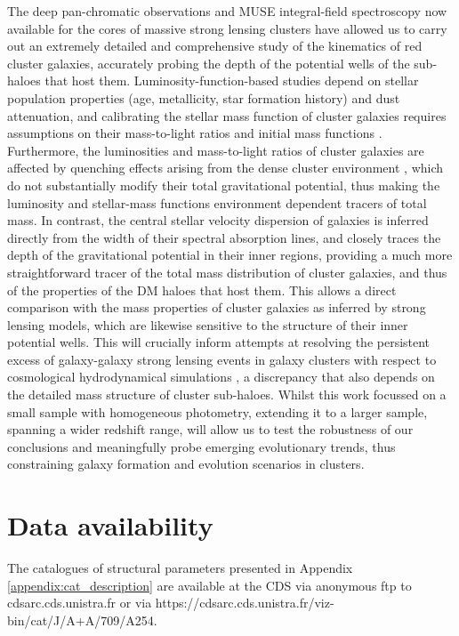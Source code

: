 \documentclass{aa}
\begin{document}
The deep pan-chromatic observations and MUSE integral-field spectroscopy now available for the cores of massive strong lensing clusters have allowed us to carry out an extremely detailed and comprehensive study of the kinematics of red cluster galaxies, accurately probing the depth of the potential wells of the sub-haloes that host them. Luminosity-function-based studies depend on stellar population properties (age, metallicity, star formation history) and dust attenuation, and calibrating the stellar mass function of cluster galaxies requires assumptions on their mass-to-light ratios and initial mass functions \citep[e.g.][]{bernardi10,monterodorta17}. Furthermore, the luminosities and mass-to-light ratios of cluster galaxies are affected by quenching effects arising from the dense cluster environment \citep[e.g. ram-pressure stripping and starvation, see][]{gunn72,larson80,peng10b}, which do not substantially modify their total gravitational potential, thus making the luminosity and stellar-mass functions environment dependent tracers of total mass. In contrast, the central stellar velocity dispersion of galaxies is inferred directly from the width of their spectral absorption lines, and closely traces the depth of the gravitational potential in their inner regions, providing a much more straightforward tracer of the total mass distribution of cluster galaxies, and thus of the properties of the DM haloes that host them. This allows  a direct comparison with the mass properties of cluster galaxies as inferred by strong lensing models, which are likewise sensitive to the structure of their inner potential wells. This will crucially inform attempts at resolving the persistent excess of galaxy-galaxy strong lensing events in galaxy clusters with respect to cosmological hydrodynamical simulations \citep[][]{meneghetti20,meneghetti22}, a discrepancy that also depends on the detailed mass structure of cluster sub-haloes. Whilst this work focussed on a small sample with homogeneous photometry, extending it to a larger sample, spanning a wider redshift range, will allow us to test the robustness of our conclusions and meaningfully probe emerging evolutionary trends, thus constraining galaxy formation and evolution scenarios in clusters.

\section*{Data availability}

The catalogues of structural parameters presented in Appendix \ref{appendix:cat_description} are available at the CDS via anonymous ftp to cdsarc.cds.unistra.fr or via https://cdsarc.cds.unistra.fr/viz-bin/cat/J/A+A/709/A254.
\end{document}
